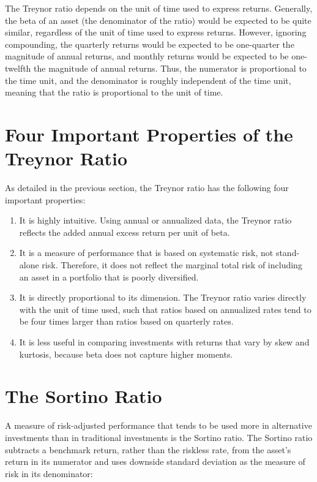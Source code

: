 \documentclass[11pt]{article}
\begin{document}
The Treynor ratio depends on the unit of time used to express returns. Generally, the beta of an asset (the denominator of the ratio) would be expected to be quite similar, regardless of the unit of time used to express returns. However, ignoring compounding, the quarterly returns would be expected to be one-quarter the\\
magnitude of annual returns, and monthly returns would be expected to be one-twelfth the magnitude of annual returns. Thus, the numerator is proportional to the time unit, and the denominator is roughly independent of the time unit, meaning that the ratio is proportional to the unit of time.

\section*{Four Important Properties of the Treynor Ratio}
As detailed in the previous section, the Treynor ratio has the following four important properties:

\begin{enumerate}
  \item It is highly intuitive. Using annual or annualized data, the Treynor ratio reflects the added annual excess return per unit of beta.

  \item It is a measure of performance that is based on systematic risk, not stand-alone risk. Therefore, it does not reflect the marginal total risk of including an asset in a portfolio that is poorly diversified.

  \item It is directly proportional to its dimension. The Treynor ratio varies directly with the unit of time used, such that ratios based on annualized rates tend to be four times larger than ratios based on quarterly rates.

  \item It is less useful in comparing investments with returns that vary by skew and kurtosis, because beta does not capture higher moments.

\end{enumerate}

\section*{The Sortino Ratio}
A measure of risk-adjusted performance that tends to be used more in alternative investments than in traditional investments is the Sortino ratio. The Sortino ratio subtracts a benchmark return, rather than the riskless rate, from the asset's return in its numerator and uses downside standard deviation as the measure of risk in its denominator:
\end{document}

